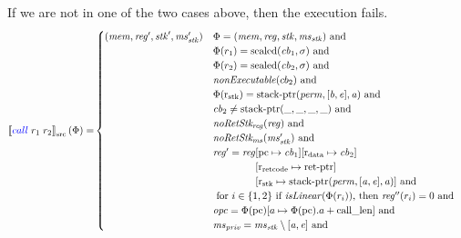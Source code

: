\documentclass[a4paper]{article}
\newcommand{\sem}[1]{\left\llbracket #1 \right\rrbracket}
\newcommand{\ssem}[2][\Phi]{\sem{#2}_{\mathrm{src}}(#1)}
\newcommand{\sourcecolor}[1]{\color{blue}}
\newcommand{\src}[1]{{\sourcecolor{} #1}}
\newcommand{\zinstr}[1]{#1}
\newcommand{\twoinstr}[3]{
  \ifthenelse{\equal{#2#3}{}}
  {\zinstr{#1}}
  {\zinstr{#1} \; #2 \; #3}
}
\newcommand{\scall}[2]{\twoinstr{\src{call}}{#1}{#2}}
\newcommand{\update}[2]{[#1 \mapsto #2]}
\newcommand{\shareddom}[1]{\mathrm{#1}}
\newcommand{\perm}{\var{perm}}
\newcommand{\stkptr}[1]{\mathrm{stack\text{-}ptr}(#1)}
\newcommand{\retptr}{\mathrm{ret\text{-}ptr}}
\newcommand{\sealed}[1]{\shareddom{sealed}(#1)}
\newcommand{\var}[1]{\mathit{#1}}
\newcommand{\reg}{\var{reg}}
\newcommand{\mem}{\var{mem}}
\newcommand{\ms}{\var{ms}}
\newcommand{\stk}{\var{stk}}
\newcommand{\priv}{\var{priv}}
\newcommand{\opc}{\var{opc}}
\newcommand{\cb}{\var{cb}}
\newcommand{\baddr}{\var{b}}
\newcommand{\eaddr}{\var{e}}
\newcommand{\aaddr}{\var{a}}
\newcommand{\stdrng}{[\baddr,\eaddr]}
\newcommand{\constant}[1]{\mathrm{#1}}
\newcommand{\calllen}{\constant{call\_len}}
\newcommand{\pcreg}{\mathrm{pc}}
\newcommand{\rstk}{\mathrm{r}_\mathrm{stk}}
\newcommand{\rretc}{\mathrm{r}_\mathrm{ret code}}
\newcommand{\rdata}{\mathrm{r}_\mathrm{data}}
\newcommand{\plainfun}[2]{
  \ifthenelse{\equal{#2}{}}
  {\mathit{#1}}
  {\mathit{#1}(#2)}
}
\newcommand{\nonExec}[1]{\plainfun{nonExecutable}{#1}}
\newcommand{\isLinear}[1]{\plainfun{isLinear}{#1}}
\newcommand{\noRetStkReg}[1]{\plainfun{noRetStk_{reg}}{#1}}
\newcommand{\noRetStkMs}[1]{\plainfun{noRetStk_{ms}}{#1}}
\begin{document}
If we are not in one of the two cases above, then the execution fails.
\begin{align*}
  \ssem{\scall{r_1}{r_2}} = & 
    \begin{cases}
      (\mem,\reg',\stk',\ms_\stk') & \arraycolsep=0pt
                                      \begin{array}[t]{l}
                                        \Phi = (\mem,\reg,\stk,\ms_\stk) \text{ and } \\
                                        \Phi(r_1) = \sealed{\cb_1,\sigma} \text{ and } \\
                                        \Phi(r_2) = \sealed{\cb_2,\sigma} \text{ and } \\
                                        \nonExec{cb_2} \text{ and } \\
                                        \Phi(\rstk) = \stkptr{\perm, \stdrng, \aaddr} \text{ and } \\
                                        \cb_2 \neq \stkptr{\_,\_,\_,\_} \text{ and } \\
                                        \noRetStkReg{\reg} \text{ and } \\
                                        \noRetStkMs{\ms_\stk'} \text{ and } \\
                                        \reg' = \reg
                                        \begin{array}[t]{l}
                                        \update{\pcreg}{\cb_1}\update{\rdata}{\cb_2}\\
                                        \update{\rretc}{\retptr}\\
                                        \update{\rstk}{\stkptr{\perm,[\aaddr,\eaddr],\aaddr}} \text{ and }
                                        \end{array}
\\                                        \text{ for $i \in \{1,2\}$ if $\isLinear{\Phi(r_i)}$, then $\reg''(r_i) = 0$ and} \\
                                        \opc = \Phi(\pcreg)\update{a}{\Phi(\pcreg).a+\calllen} \text{ and } \\
                                        \ms_\priv = \ms_\stk \setminus [\aaddr,\eaddr] \text{ and } \\

\end{array}
\end{cases}
\end{align*}
\end{document}
